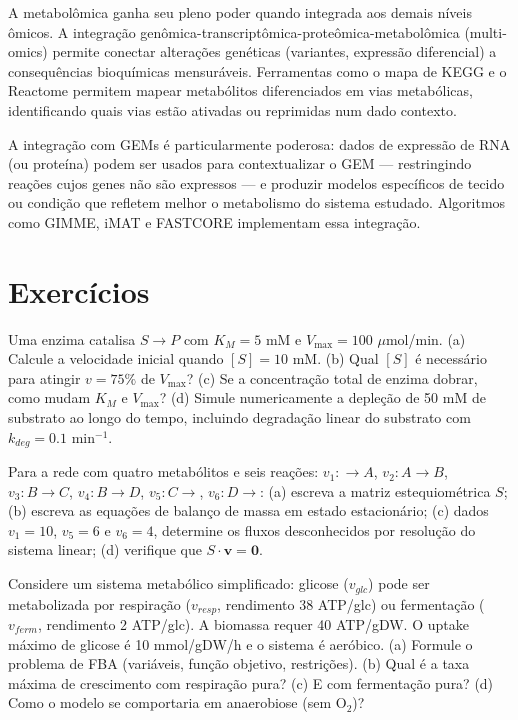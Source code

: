 A metabolômica ganha seu pleno poder quando integrada aos demais níveis ômicos. A
integração genômica-transcriptômica-proteômica-metabolômica (multi-omics) permite
conectar alterações genéticas (variantes, expressão diferencial) a consequências
bioquímicas mensuráveis. Ferramentas como o mapa de KEGG e o Reactome permitem mapear
metabólitos diferenciados em vias metabólicas, identificando quais vias estão ativadas
ou reprimidas num dado contexto.

A integração com GEMs é particularmente poderosa: dados de expressão de RNA (ou proteína)
podem ser usados para contextualizar o GEM --- restringindo reações cujos genes não são
expressos --- e produzir modelos específicos de tecido ou condição que refletem melhor
o metabolismo do sistema estudado. Algoritmos como GIMME, iMAT e FASTCORE implementam
essa integração.


\section{Exercícios}

\begin{exercicio}
Uma enzima catalisa $S \to P$ com $K_M = 5$ mM e $V_{\max} = 100$ $\mu$mol/min.
(a) Calcule a velocidade inicial quando $[S] = 10$ mM. (b) Qual $[S]$ é necessário para
atingir $v = 75\%$ de $V_{\max}$? (c) Se a concentração total de enzima dobrar, como
mudam $K_M$ e $V_{\max}$? (d) Simule numericamente a depleção de 50 mM de substrato ao
longo do tempo, incluindo degradação linear do substrato com $k_{deg} = 0.1$ min$^{-1}$.
\end{exercicio}

\begin{exercicio}
Para a rede com quatro metabólitos e seis reações: $v_1: \to A$, $v_2: A \to B$,
$v_3: B \to C$, $v_4: B \to D$, $v_5: C \to$, $v_6: D \to$: (a) escreva a matriz
estequiométrica $S$; (b) escreva as equações de balanço de massa em estado estacionário;
(c) dados $v_1 = 10$, $v_5 = 6$ e $v_6 = 4$, determine os fluxos desconhecidos por
resolução do sistema linear; (d) verifique que $S \cdot \mathbf{v} = \mathbf{0}$.
\end{exercicio}

\begin{exercicio}[FBA]
Considere um sistema metabólico simplificado: glicose ($v_{glc}$) pode ser metabolizada
por respiração ($v_{resp}$, rendimento 38 ATP/glc) ou fermentação ($v_{ferm}$, rendimento
2 ATP/glc). A biomassa requer 40 ATP/gDW. O uptake máximo de glicose é 10 mmol/gDW/h e
o sistema é aeróbico. (a) Formule o problema de FBA (variáveis, função objetivo, restrições).
(b) Qual é a taxa máxima de crescimento com respiração pura? (c) E com fermentação pura?
(d) Como o modelo se comportaria em anaerobiose (sem O$_2$)?
\end{exercicio}

